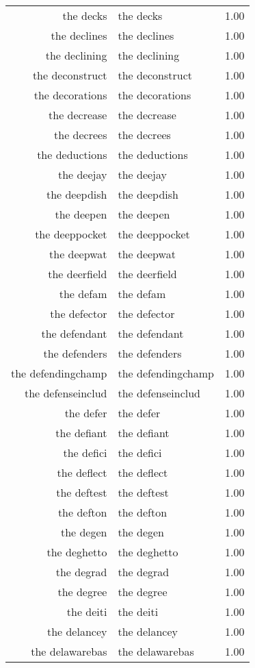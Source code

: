 \begin{table}[ht]
\begin{tabular}{rlr}
  the decks & the decks & 1.00 \\ 
  the declines & the declines & 1.00 \\ 
  the declining & the declining & 1.00 \\ 
  the deconstruct & the deconstruct & 1.00 \\ 
  the decorations & the decorations & 1.00 \\ 
  the decrease & the decrease & 1.00 \\ 
  the decrees & the decrees & 1.00 \\ 
  the deductions & the deductions & 1.00 \\ 
  the deejay & the deejay & 1.00 \\ 
  the deepdish & the deepdish & 1.00 \\ 
  the deepen & the deepen & 1.00 \\ 
  the deeppocket & the deeppocket & 1.00 \\ 
  the deepwat & the deepwat & 1.00 \\ 
  the deerfield & the deerfield & 1.00 \\ 
  the defam & the defam & 1.00 \\ 
  the defector & the defector & 1.00 \\ 
  the defendant & the defendant & 1.00 \\ 
  the defenders & the defenders & 1.00 \\ 
  the defendingchamp & the defendingchamp & 1.00 \\ 
  the defenseinclud & the defenseinclud & 1.00 \\ 
  the defer & the defer & 1.00 \\ 
  the defiant & the defiant & 1.00 \\ 
  the defici & the defici & 1.00 \\ 
  the deflect & the deflect & 1.00 \\ 
  the deftest & the deftest & 1.00 \\ 
  the defton & the defton & 1.00 \\ 
  the degen & the degen & 1.00 \\ 
  the deghetto & the deghetto & 1.00 \\ 
  the degrad & the degrad & 1.00 \\ 
  the degree & the degree & 1.00 \\ 
  the deiti & the deiti & 1.00 \\ 
  the delancey & the delancey & 1.00 \\ 
  the delawarebas & the delawarebas & 1.00 \\ 

\end{tabular}
\end{table}
